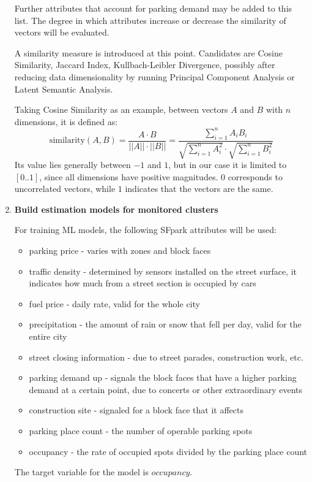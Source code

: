 \documentclass{article}
\begin{document}
\begin{large}
\begin{enumerate}
Further attributes that account for parking demand may be added to this list. The degree in which attributes increase or decrease the similarity of vectors will be evaluated.

A similarity measure is introduced at this point. Candidates are Cosine Similarity, Jaccard Index, Kullbach-Leibler Divergence, possibly after reducing data dimensionality by running Principal Component Analysis or Latent Semantic Analysis. 

Taking Cosine Similarity as an example, between vectors $A$ and $B$ with $n$ dimensions, it is defined as:
$$ \text{similarity}(A,B) = \frac{A \cdot B}{||A|| \cdot ||B||} = \frac{\sum_{i=1}^{n}A_iB_i}{\sqrt{\sum_{i=1}^{n}A_i^2} \cdot \sqrt{\sum_{i=1}^{n}B_i^2}}$$
Its value lies generally between $-1$ and $1$, but in our case it is limited to $[0..1]$, since all dimensions have positive magnitudes. $0$ corresponds to uncorrelated vectors, while $1$ indicates that the vectors are the same.

\item \textbf{Build estimation models for monitored clusters}

For training ML models, the following SFpark attributes will be used:
\begin{itemize}
\item parking price - varies with zones and block faces
\item traffic density - determined by sensors installed on the street surface, it indicates how much from a street section is occupied by cars
\item fuel price - daily rate, valid for the whole city
\item precipitation - the amount of rain or snow that fell per day, valid for the entire city
\item street closing information - due to street parades, construction work, etc.
\item parking demand up - signals the block faces that have a higher parking demand at a certain point, due to concerts or other extraordinary events
\item construction site - signaled for a block face that it affects
\item parking place count - the number of operable parking spots
\item occupancy - the rate of occupied spots divided by the parking place count
\end{itemize}
The target variable for the model is $occupancy$. 


\end{enumerate}
\end{large}
\end{document}

